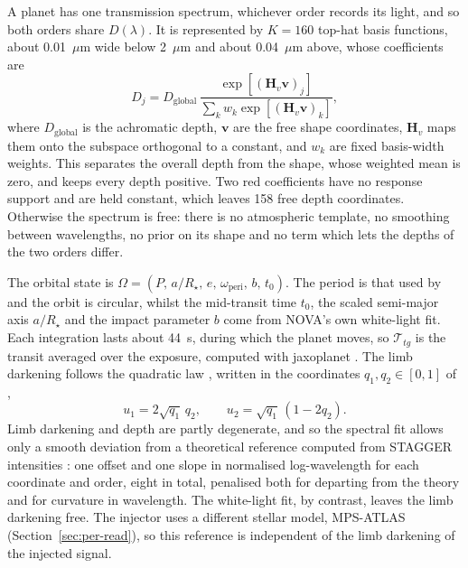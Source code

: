 A planet has one transmission spectrum, whichever order records its light,
and so both orders share $D(\lambda)$. It is represented by $K=160$ top-hat
basis functions, about 0.01~$\mu\mathrm{m}$ wide below 2~$\mu\mathrm{m}$ and
about 0.04~$\mu\mathrm{m}$ above, whose coefficients are
\begin{equation}
  D_j = D_{\mathrm{global}}\,
  \frac{\exp\!\left[(\bm{H}_v\bm{v})_j\right]}
       {\sum_k w_k \exp\!\left[(\bm{H}_v\bm{v})_k\right]} ,
  \label{eq:depth-basis}
\end{equation}
where $D_{\mathrm{global}}$ is the achromatic depth, $\bm{v}$ are the free
shape coordinates, $\bm{H}_v$ maps them onto the subspace orthogonal to a
constant, and $w_k$ are fixed basis-width weights. This separates the overall
depth from the shape, whose weighted mean is zero, and keeps every depth
positive. Two red coefficients have no response support and are held
constant, which leaves 158 free depth coordinates. Otherwise the spectrum is
free: there is no atmospheric template, no smoothing between wavelengths, no
prior on its shape and no term which lets the depths of the two orders
differ.

The orbital state is
$\Omega=(P,\,a/R_\star,\,e,\,\omega_{\mathrm{peri}},\,b,\,t_0)$. The period
is that used by \citet{LouieEtAl2025} and the orbit is circular, whilst the
mid-transit time $t_0$, the scaled semi-major axis $a/R_\star$ and the impact
parameter $b$ come from NOVA's own white-light fit. Each integration lasts
about 44~s, during which the planet moves, so $\mathcal{T}_{tg}$ is the
transit averaged over the exposure, computed with jaxoplanet
\citep{Jaxoplanet2025}. The limb darkening follows the quadratic law
\citep{MandelAgol2002}, written in the coordinates $q_1,q_2\in[0,1]$ of
\citet{Kipping2013},
\begin{equation}
 u_1=2\sqrt{q_1}\,q_2, \qquad
 u_2=\sqrt{q_1}\,(1-2q_2).
 \label{eq:kipping-coordinates}
\end{equation}
Limb darkening and depth are partly degenerate, and so the spectral fit
allows only a smooth deviation from a theoretical reference computed from
STAGGER intensities \citep{MagicEtAl2015}: one offset and one slope in
normalised log-wavelength for each coordinate and order, eight in total,
penalised both for departing from the theory and for curvature in
wavelength. The white-light fit, by contrast, leaves the limb darkening free.
The injector uses a different stellar model, MPS-ATLAS
(Section~\ref{sec:per-read}), so this reference is independent of the limb
darkening of the injected signal.

